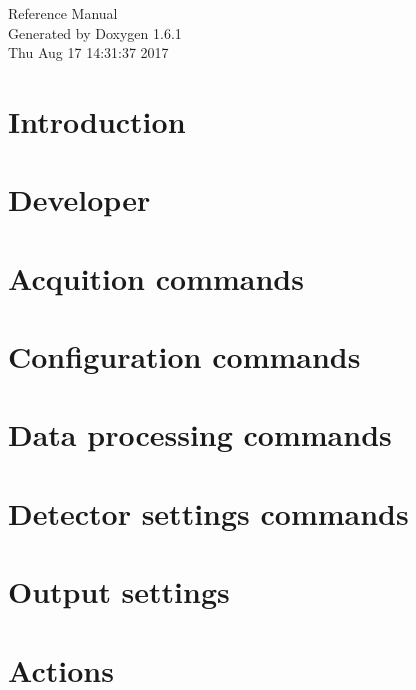 \documentclass[a4paper]{article}
\begin{document}
\hypersetup{pageanchor=false}
\begin{titlepage}
\vspace*{7cm}
\begin{center}
{\Large Reference Manual}\\
\vspace*{1cm}
{\large Generated by Doxygen 1.6.1}\\
\vspace*{0.5cm}
{\small Thu Aug 17 14:31:37 2017}\\
\end{center}
\end{titlepage}
\tableofcontents
{}
\hypersetup{pageanchor=true}
\section{Introduction}
\label{index}\hypertarget{index}{}
\section{Developer}
\label{test}
\hypertarget{test}{}

\section{Acquition commands}
\label{acquisition}
\hypertarget{acquisition}{}

\section{Configuration commands}
\label{config}
\hypertarget{config}{}

\section{Data processing commands}
\label{data}
\hypertarget{data}{}

\section{Detector settings commands}
\label{settings}
\hypertarget{settings}{}

\section{Output settings}
\label{output}
\hypertarget{output}{}

\section{Actions}
\label{actions}
\hypertarget{actions}{}

\end{document}
